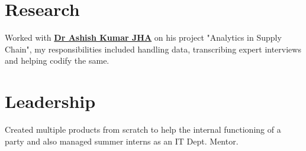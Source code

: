 \documentclass[]{deedy-resume-openfont}
\begin{document}
\begin{minipage}[t]{0.66\textwidth}

\section{Research}
Worked with \textbf{\href{https://www.rennes-sb.com/faculty/dr-ashish-kumar-jha//}{Dr Ashish Kumar JHA}} on his project "Analytics in Supply Chain", my responsibilities included handling data, transcribing expert interviews and helping codify the same.
\sectionsep

\section{Leadership}
Created multiple products from scratch to help the internal functioning of a party and also managed summer interns as an IT Dept. Mentor.
\sectionsep


\end{minipage} 
\end{document}
